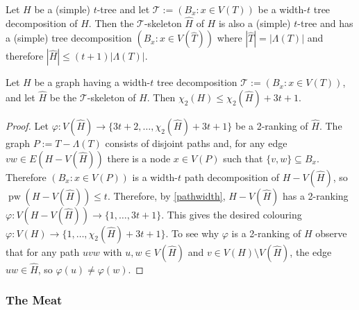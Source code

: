 \documentclass[kpfonts]{patmorin}
\DeclareMathOperator{\pw}{pw}
\newcommand{\trn}{\chi_2}
\theoremstyle{named}
\newcommand{\weirdref}[2]{\cref{#1}#2}
\begin{document}
\begin{obs}\label{skeleton-size}
    Let $H$ be a (simple) $t$-tree and let $\mathcal{T}:=(B_x:x\in V(T))$ be a width-$t$ tree decomposition of $H$.  Then the $\mathcal{T}$-skeleton $\hat{H}$ of $H$ is also a (simple) $t$-tree and has a (simple) tree decomposition $(B_x:x\in V(\hat{T}))$ where $|\hat{T}|=|\Lambda(T)|$ and therefore $|\hat{H}|\le (t+1)|\Lambda(T)|$.
\end{obs}

\begin{lem}\label{skeleton-colour}
    Let $H$ be a graph having a width-$t$ tree decomposition $\mathcal{T}:=(B_x:x\in V(T))$, and let $\hat{H}$ be the $\mathcal{T}$-skeleton of $H$.  Then $\trn(H)\le \trn(\hat{H}) + 3t+1$.
\end{lem}

\begin{proof}
    Let $\varphi:V(\hat{H})\to \{3t+2,\ldots,\trn(\hat{H})+3t+1\}$ be a 2-ranking of $\hat{H}$. The graph $P:=T-\Lambda(T)$ consists of disjoint paths and, for any edge $vw\in E(H-V(\hat{H}))$ there is a node $x\in V(P)$ such that $\{v,w\}\subseteq B_x$.  Therefore $(B_x:x\in V(P))$ is a width-$t$ path decomposition of $H-V(\hat{H})$, so $\pw(H-V(\hat{H}))\le t$.  Therefore, by \cref{pathwidth}, $H-V(\hat{H})$ has a 2-ranking $\varphi:V(H-V(\hat{H}))\to\{1,\ldots,3t+1\}$.  This gives the desired colouring $\varphi: V(H)\to\{1,\ldots,\trn(\hat{H})+3t+1\}$.  To see why $\varphi$ is a 2-ranking of $H$ observe that for any path $uvw$ with $u,w\in V(\hat{H})$ and $v\in V(H)\setminus V(\hat{H})$, the edge $uw\in\hat{H}$, so $\varphi(u)\neq\varphi(w)$.
\end{proof}

\subsubsection{The Meat}

\end{document}
